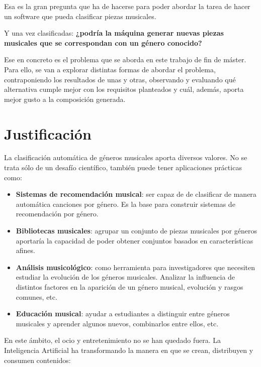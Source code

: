 Esa es la gran pregunta que ha de hacerse para poder abordar la tarea de hacer un software que pueda clasificar piezas musicales.

Y una vez clasificadas: \textbf{¿podría la máquina generar nuevas piezas musicales que se correspondan con un género conocido?}

Ese en concreto es el problema que se aborda en este trabajo de fin de máster. Para ello, se van a explorar distintas formas de abordar el problema, contraponiendo los resultados de unas y otras, observando y evaluando qué alternativa cumple mejor con los requisitos planteados y cuál, además, aporta mejor gusto a la composición generada.


\section{Justificación}
La clasificación automática de géneros musicales aporta diversos valores. No se trata sólo de un desafío científico, también puede tener aplicaciones prácticas como:

\begin{itemize}
    \item \textbf{Sistemas de recomendación musical}: ser capaz de de clasificar de manera automática canciones por género. Es la base para construir sistemas de recomendación por género.
    \item \textbf{Bibliotecas musicales}: agrupar un conjunto de piezas musicales por géneros aportaría la capacidad de poder obtener conjuntos basados en características afines.
    \item \textbf{Análisis musicológico}: como herramienta para investigadores que necesiten estudiar la evolución de los géneros musicales. Analizar la influencia de distintos factores en la aparición de un género musical, evolución y rasgos comunes, etc.
    \item \textbf{Educación musical}: ayudar a estudiantes a distinguir entre géneros musicales y aprender algunos nuevos, combinarlos entre ellos, etc.
\end{itemize}

En este ámbito, el ocio y entretenimiento no se han quedado fuera. La Inteligencia Artificial ha transformando la manera en que se crean, distribuyen y consumen contenidos:

